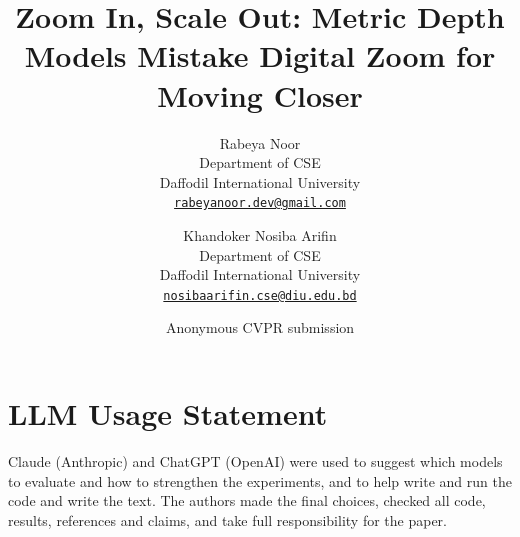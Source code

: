 \documentclass[10pt,twocolumn,letterpaper]{article}
\title{Zoom In, Scale Out: Metric Depth Models Mistake Digital Zoom for Moving Closer}
\author{
Rabeya Noor\\
Department of CSE\\
Daffodil International University\\
\href{mailto:rabeyanoor.dev@gmail.com}{\tt\small rabeyanoor.dev@gmail.com}
\and
Khandoker Nosiba Arifin\\
Department of CSE\\
Daffodil International University\\
\href{mailto:nosibaarifin.cse@diu.edu.bd}{\tt\small nosibaarifin.cse@diu.edu.bd}
}
\author{Anonymous CVPR submission}
\begin{document}
\maketitle









\section*{LLM Usage Statement}
Claude (Anthropic) and ChatGPT (OpenAI) were used to suggest which models to evaluate and how to
strengthen the experiments, and to help write and run the code and write the text. The authors made the final
choices, checked all code, results, references and claims, and take full responsibility for the paper.
{
    \small
    
    
}
\end{document}
